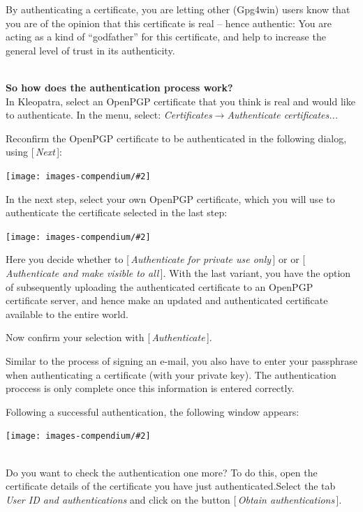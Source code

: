 \documentclass[a4paper,11pt,oneside,openright,titlepage]{scrbook}
\newcommand{\Button}[1]{[\,\textit{#1}\,]}
\newcommand{\Menu}[1]{\textit{#1}}
\newcommand{\Email}{e-mail}
\newcommand{\IncludeImage}[2][]{
\begin{center}
  \texttt{[image: images-compendium/\#2]}%
\end{center}
}
\begin{document}
By authenticating a certificate, you are letting other (Gpg4win) users
know that you are of the opinion that this certificate is real --
hence authentic: You are acting as a kind of ``godfather'' for this
certificate, and help to increase the general level of trust in its
authenticity.

~\\
\textbf{So how does the authentication process work?}\\
In Kleopatra, select an OpenPGP certificate that you think is real and
would like to authenticate. In the menu, select:
\Menu{Certificates$\rightarrow$Authenticate certificates...}

Reconfirm the OpenPGP certificate to be authenticated in the following
dialog, using \Button{Next}:

\IncludeImage[width=0.85\textwidth]{sc-kleopatra-certifyCertificate1_en}

\clearpage
In the next step, select your own OpenPGP certificate, which you will
use to authenticate the certificate selected in the last step:

\IncludeImage[width=0.85\textwidth]{sc-kleopatra-certifyCertificate2_en}

Here you decide whether to \Button{Authenticate for private use only}
or or \Button{Authenticate and make visible to all}. With the last
variant, you have the option of subsequently uploading the
authenticated certificate to an OpenPGP certificate server, and hence make an
updated and authenticated certificate available to the entire world.

Now confirm your selection with \Button{Authenticate}.

Similar to the process of signing an \Email{}, you also have to enter
your passphrase when authenticating a certificate (with your private
key). The authentication proccess is only complete once this
information is entered correctly.

\clearpage
Following a successful authentication, the following window appears:

\IncludeImage[width=0.85\textwidth]{sc-kleopatra-certifyCertificate3_en}

~\\Do you want to check the authentication one more? To do this, open
the certificate details of the certificate you have just
authenticated.Select the tab \Menu{User ID and authentications} and
click on the button \Button{Obtain authentications}.
\end{document}
